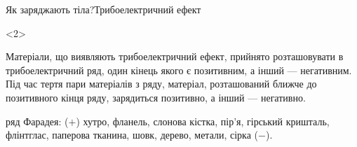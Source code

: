 \documentclass{beamer}
\begin{document}
\begin{frame}{Як заряджають тіла?}{Трибоелектричний ефект}
	\begin{onlyenv}
		\begin{block}{}\justifying
			Матеріали, що виявляють трибоелектричний ефект, прийнято
			розташовувати в \alert{трибоелектричний ряд}, один кінець якого є
			позитивним, а інший --- негативним. Під час тертя пари матеріалів
			з ряду, матеріал, розташований ближче до позитивного кінця ряду,
			зарядиться позитивно, а інший --- негативно.

			\bigskip

			ряд Фарадея: ($+$) хутро, фланель, слонова кістка, пір'я, гірський
			кришталь, флінтглас, паперова тканина, шовк, дерево, метали, сірка
			($-$).
		\end{block}
	\end{onlyenv}
\end{frame}


%
%
%
\end{document}
